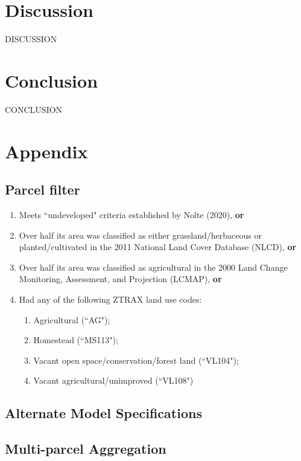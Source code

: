 \documentclass[12pt]{article}
\begin{document}
\section{Discussion}

DISCUSSION

\newpage

\section{Conclusion}

CONCLUSION

\newpage

\section{Appendix}


\subsection{Parcel filter}

\begin{enumerate}
    \item Meets ``undeveloped" criteria established by Nolte (2020), \textbf{or}
    \item Over half its area was classified as either grassland/herbaceous or planted/cultivated in the 2011 National Land Cover Database (NLCD), \textbf{or}
    \item Over half its area was classified as agricultural in the 2000 Land Change Monitoring, Assessment, and Projection (LCMAP), \textbf{or}
    \item Had any of the following ZTRAX land use codes:
    \begin{enumerate}
        \item Agricultural (``AG");
        \item Homestead (``MS113");
        \item Vacant open space/conservation/forest land (``VL104");
        \item Vacant agricultural/unimproved (``VL108")
    \end{enumerate}
\end{enumerate}

\subsection{Alternate Model Specifications}


\subsection{Multi-parcel Aggregation}



\newpage


\printbibliography
\end{document}
